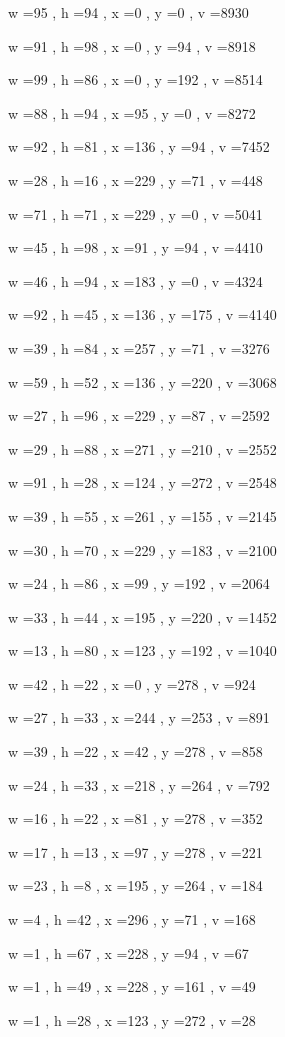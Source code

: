 \documentclass[11pt]{article}
\begin{document}
w =95 , h =94 , x =0 , y =0 , v =8930
\par
w =91 , h =98 , x =0 , y =94 , v =8918
\par
w =99 , h =86 , x =0 , y =192 , v =8514
\par
w =88 , h =94 , x =95 , y =0 , v =8272
\par
w =92 , h =81 , x =136 , y =94 , v =7452
\par
w =28 , h =16 , x =229 , y =71 , v =448
\par
w =71 , h =71 , x =229 , y =0 , v =5041
\par
w =45 , h =98 , x =91 , y =94 , v =4410
\par
w =46 , h =94 , x =183 , y =0 , v =4324
\par
w =92 , h =45 , x =136 , y =175 , v =4140
\par
w =39 , h =84 , x =257 , y =71 , v =3276
\par
w =59 , h =52 , x =136 , y =220 , v =3068
\par
w =27 , h =96 , x =229 , y =87 , v =2592
\par
w =29 , h =88 , x =271 , y =210 , v =2552
\par
w =91 , h =28 , x =124 , y =272 , v =2548
\par
w =39 , h =55 , x =261 , y =155 , v =2145
\par
w =30 , h =70 , x =229 , y =183 , v =2100
\par
w =24 , h =86 , x =99 , y =192 , v =2064
\par
w =33 , h =44 , x =195 , y =220 , v =1452
\par
w =13 , h =80 , x =123 , y =192 , v =1040
\par
w =42 , h =22 , x =0 , y =278 , v =924
\par
w =27 , h =33 , x =244 , y =253 , v =891
\par
w =39 , h =22 , x =42 , y =278 , v =858
\par
w =24 , h =33 , x =218 , y =264 , v =792
\par
w =16 , h =22 , x =81 , y =278 , v =352
\par
w =17 , h =13 , x =97 , y =278 , v =221
\par
w =23 , h =8 , x =195 , y =264 , v =184
\par
w =4 , h =42 , x =296 , y =71 , v =168
\par
w =1 , h =67 , x =228 , y =94 , v =67
\par
w =1 , h =49 , x =228 , y =161 , v =49
\par
w =1 , h =28 , x =123 , y =272 , v =28
\par
\newpage
\end{document}
